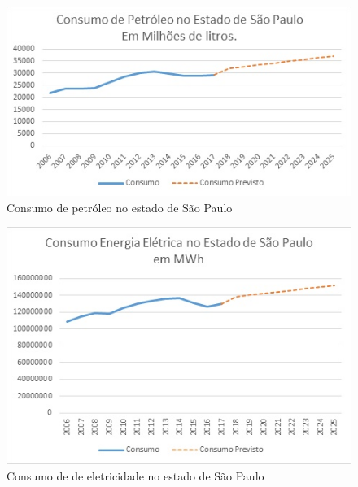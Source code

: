 \begin{figure}[htb]
	\begin{center}
	    \includegraphics[scale=1.0]{consumo_petroleo_sp.jpg}
	\end{center}
	\vspace*{-0.5cm}
	\caption{\label{fig_graficooo}Consumo de petróleo no estado de São Paulo}
\end{figure}

\begin{figure}[htb]
	\begin{center}
	    \includegraphics[scale=1.0]{consumo_eletricidade_sp.jpg}
	\end{center}
	\vspace*{-0.5cm}
	\caption{\label{fig_graficoooo}Consumo de de eletricidade no estado de São Paulo}
\end{figure}

